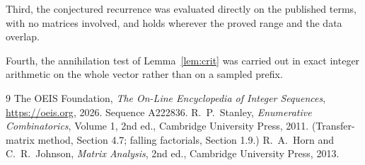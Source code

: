\documentclass[11pt,a4paper]{article}
\theoremstyle{plain}
\theoremstyle{definition}
\begin{document}
Third, the conjectured recurrence was evaluated directly on the published terms, with no
matrices involved, and holds wherever the proved range and the data overlap.

Fourth, the annihilation test of Lemma~\ref{lem:crit} was carried out in exact integer
arithmetic on the whole vector rather than on a sampled prefix.

\begin{thebibliography}{9}
 The OEIS Foundation, \emph{The On-Line Encyclopedia of Integer
Sequences}, \url{https://oeis.org}, 2026. Sequence A222836.
 R.~P.~Stanley, \emph{Enumerative Combinatorics}, Volume 1, 2nd ed.,
Cambridge University Press, 2011. (Transfer-matrix method, Section 4.7; falling factorials,
Section 1.9.)
 R.~A.~Horn and C.~R.~Johnson, \emph{Matrix Analysis}, 2nd ed., Cambridge
University Press, 2013.
\end{thebibliography}
\end{document}
